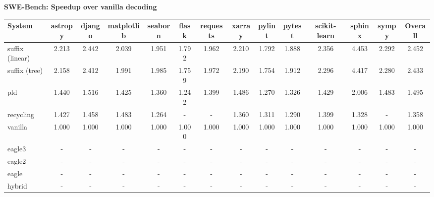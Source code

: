 \textbf{SWE-Bench: Speedup over vanilla decoding}
\begin{table}[H]
\begin{adjustbox}{width=\linewidth}
\centering
\begin{tabular}{lccccccccccccc}
\toprule
\textbf{System} & astropy & django & matplotlib & seaborn & flask & requests & xarray & pylint & pytest & scikit-learn & sphinx & sympy & \textbf{Overall} \\
\midrule
suffix (linear) & 2.213 & 2.442 & 2.039 & 1.951 & 1.792 & 1.962 & 2.210 & 1.792 & 1.888 & 2.356 & 4.453 & 2.292 & 2.452 \\
suffix (tree) & 2.158 & 2.412 & 1.991 & 1.985 & 1.759 & 1.972 & 2.190 & 1.754 & 1.912 & 2.296 & 4.417 & 2.280 & 2.433 \\
pld & 1.440 & 1.516 & 1.425 & 1.360 & 1.242 & 1.399 & 1.486 & 1.270 & 1.326 & 1.429 & 2.006 & 1.483 & 1.495 \\
recycling & 1.427 & 1.458 & 1.483 & 1.264 & - & - & 1.360 & 1.311 & 1.290 & 1.399 & 1.328 & - & 1.358 \\
vanilla & 1.000 & 1.000 & 1.000 & 1.000 & 1.000 & 1.000 & 1.000 & 1.000 & 1.000 & 1.000 & 1.000 & 1.000 & 1.000 \\
eagle3 & - & - & - & - & - & - & - & - & - & - & - & - & - \\
eagle2 & - & - & - & - & - & - & - & - & - & - & - & - & - \\
eagle & - & - & - & - & - & - & - & - & - & - & - & - & - \\
hybrid & - & - & - & - & - & - & - & - & - & - & - & - & - \\
\bottomrule
\end{tabular}
\end{adjustbox}
\end{table}
